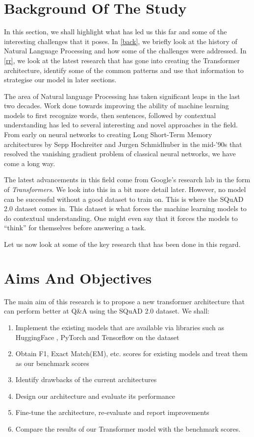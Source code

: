 \documentclass[a4paper,12pt]{report}
\begin{document}
        \section{Background Of The Study}\label{c1background}
        	In this section, we shall highlight what has led us this far and some of the interesting challenges that it poses. In \ref{back}, we briefly look at the history of Natural Language Processing and how some of the challenges were addressed. In \ref{rr}, we look at the latest research that has gone into creating the Transformer architecture, identify some of the common patterns and use that information to strategise our model in later sections.

            The area of Natural language Processing has taken significant leaps in the last two decades. Work done towards improving the ability of machine learning models to first recognize words, then sentences, followed by contextual understanding has led to several interesting and novel approaches in the field. From early on neural networks to creating Long Short-Term Memory architectures \citep{lstmoriginal} by Sepp Hochreiter and Jurgen Schmidhuber in the mid-'90s that resolved the vanishing gradient problem of classical neural networks, we have come a long way.

           The latest advancements in this field come from Google's research lab in the form of \textit{Transformers}. We look into this in a bit more detail later. However, no model can be successful without a good dataset to train on. This is where the SQuAD 2.0 dataset \citep{dataset} comes in. This dataset is what forces the machine learning models to do contextual understanding. One might even say that it forces the models to ``think'' for themselves before answering a task.

           Let us now look at some of the key research that has been done in this regard.


        \section{Aims And Objectives}\label{12}
        	The main aim of this research is to propose a new transformer architecture that can perform better at Q\&A using the SQuAD 2.0 dataset.
        We shall:
        \begin{enumerate}
        	\item Implement the existing models that are available via libraries such as HuggingFace \citep{hfTransformers}, PyTorch and Tensorflow on the dataset
        	\item Obtain F1, Exact Match(EM), etc. scores for existing models and treat them as our benchmark scores
        	\item Identify drawbacks of the current architectures
        	\item Design our architecture and evaluate its performance
        	\item Fine-tune the architecture, re-evaluate and report improvements
        	\item Compare the results of our Transformer model with the benchmark scores.
        \end{enumerate}
\end{document}
